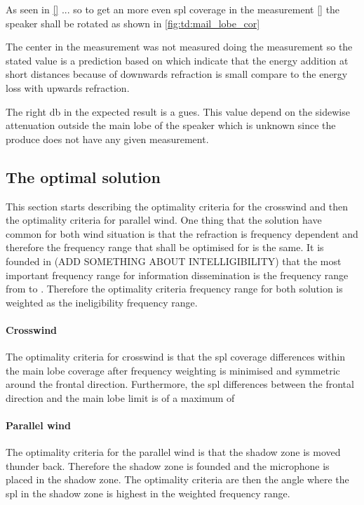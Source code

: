 As seen in  \autoref{} ... so to get an more even \gls{spl} coverage in the measurement \autoref{} the speaker shall be rotated as shown in \autoref{fig:td:mail_lobe_cor} 




The center in the measurement was not measured doing the measurement so the stated value is a prediction based on \citep{review_of_sound} which indicate that the energy addition at short distances because of downwards refraction is small compare to the energy loss with upwards refraction. 

The right \si{\decibel} in the expected result is a gues. This value depend on the sidewise attenuation outside the main lobe of the speaker which is unknown since the produce does not have any given measurement.



\subsection{The optimal solution}
This section starts describing the optimality criteria for the crosswind and then the optimality criteria for parallel wind. One thing that the solution have common for both wind situation is that the refraction is frequency dependent and therefore the frequency range that shall be optimised for is the same. It is founded in (ADD SOMETHING ABOUT INTELLIGIBILITY) that the most important frequency range for information dissemination is the frequency range from  to . Therefore the optimality criteria frequency range for both solution is weighted as the ineligibility frequency range. 

\paragraph{Crosswind} The optimality criteria for crosswind is that the \gls{spl} coverage differences within the main lobe coverage after frequency weighting is minimised and symmetric around the frontal direction. Furthermore, the \gls{spl} differences between the frontal direction and the main lobe limit is of a maximum of 

\paragraph{Parallel wind} The optimality criteria for the parallel wind is that the shadow zone is moved thunder back. Therefore the shadow zone is founded and the microphone is placed in the shadow zone. The optimality criteria are then the angle where the \gls{spl} in the shadow zone is highest in the weighted frequency range. 
